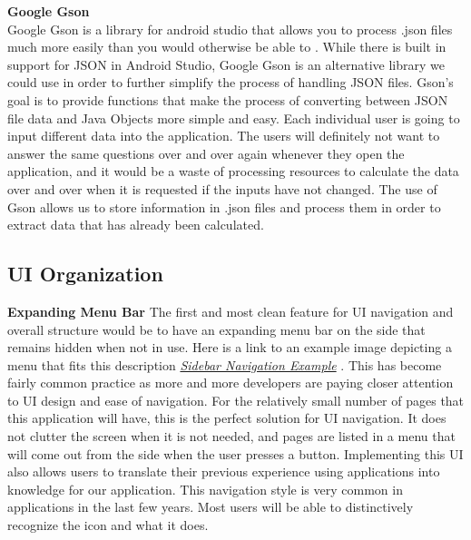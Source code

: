\documentclass[onecolumn, draftclsnofoot,10pt, compsoc]{IEEEtran}
\begin{document}
\noindent \textbf{Google Gson} \\
Google Gson is a library for android studio that allows you to process .json files much more easily than you would otherwise be able to \cite{googlegson}.
While there is built in support for JSON in Android Studio, Google Gson is an alternative library we could use in order to further simplify the process of handling JSON files.
Gson's goal is to provide functions that make the process of converting between JSON file data and Java Objects more simple and easy.
Each individual user is going to input different data into the application. 
The users will definitely not want to answer the same questions over and over again whenever they open the application, and it would be a waste of processing resources
to calculate the data over and over when it is requested if the inputs have not changed.
The use of Gson allows us to store information in .json files and process them in order to extract data that has already been calculated.\\


\subsection{UI Organization}

\noindent \textbf{Expanding Menu Bar}
The first and most clean feature for UI navigation and overall structure would be to have an expanding menu bar on the side that remains hidden when not in use.
Here is a link to an example image depicting a menu that fits this description \href{https://www.designyourway.net/blog/wp-content/uploads/2016/05/dribbble-1.jpg}{\em Sidebar Navigation Example} \cite{sidebarui}.
This has become fairly common practice as more and more developers are paying closer attention to UI design and ease of navigation. For the relatively small number of pages that this application will have, this is the perfect solution for UI navigation. It does not clutter the screen when it is not needed, and pages are listed in a menu that will come out from the side when the user presses a button.
Implementing this UI also allows users to translate their previous experience using applications into knowledge for our application.
This navigation style is very common in applications in the last few years.
Most users will be able to distinctively recognize the icon and what it does.\\

\clearpage
\end{document}
